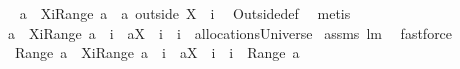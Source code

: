 \begin{isabellebody}
%
\isadelimproof
%
\endisadelimproof
%
\isatagproof
{}\isamarkupfalse%
\ {\isacharminus}\isanewline
{}\isamarkupfalse%
\ {\isachardoublequoteopen}a\ {\isacharminus}\ {\isacharparenleft}{\isacharparenleft}X{\isasymunion}{\isacharbraceleft}i{\isacharbraceright}{\isacharparenright}{\isasymtimes}{\isacharparenleft}Range\ a{\isacharparenright}{\isacharparenright}\ {\isacharequal}\ a\ outside\ {\isacharparenleft}X\ {\isasymunion}\ {\isacharbraceleft}i{\isacharbraceright}{\isacharparenright}{\isachardoublequoteclose}\ \isamarkupfalse%
\ Outside{\isacharunderscore}def\ \isamarkupfalse%
\ metis\isanewline
{}\isamarkupfalse%
\ \isamarkupfalse%
\ {\isachardoublequoteopen}{\isacharparenleft}a\ {\isacharminus}\ {\isacharparenleft}{\isacharparenleft}X{\isasymunion}{\isacharbraceleft}i{\isacharbraceright}{\isacharparenright}{\isasymtimes}{\isacharparenleft}Range\ a{\isacharparenright}{\isacharparenright}{\isacharparenright}\ {\isasymunion}\ {\isacharparenleft}{\isacharbraceleft}{\isacharparenleft}i{\isacharcomma}\ {\isasymUnion}\ {\isacharparenleft}a{\isacharbackquote}{\isacharbackquote}{\isacharparenleft}X\ {\isasymunion}\ {\isacharbraceleft}i{\isacharbraceright}{\isacharparenright}{\isacharparenright}{\isacharparenright}{\isacharbraceright}\ {\isacharminus}\ {\isacharbraceleft}{\isacharparenleft}i{\isacharcomma}{\isacharbraceleft}{\isacharbraceright}{\isacharparenright}{\isacharbraceright}{\isacharparenright}\ {\isasymin}\ allocationsUniverse{\isachardoublequoteclose}\isanewline
{}\isamarkupfalse%
\ assms\ lm{}{}\ \isamarkupfalse%
\ fastforce\isanewline
{}\isamarkupfalse%
\ \isamarkupfalse%
\ {\isachardoublequoteopen}{\isasymUnion}\ {\isacharparenleft}Range\ {\isacharparenleft}{\isacharparenleft}a\ {\isacharminus}\ {\isacharparenleft}{\isacharparenleft}X{\isasymunion}{\isacharbraceleft}i{\isacharbraceright}{\isacharparenright}{\isasymtimes}{\isacharparenleft}Range\ a{\isacharparenright}{\isacharparenright}{\isacharparenright}\ {\isasymunion}\ {\isacharparenleft}{\isacharbraceleft}{\isacharparenleft}i{\isacharcomma}\ {\isasymUnion}\ {\isacharparenleft}a{\isacharbackquote}{\isacharbackquote}{\isacharparenleft}X\ {\isasymunion}\ {\isacharbraceleft}i{\isacharbraceright}{\isacharparenright}{\isacharparenright}{\isacharparenright}{\isacharbraceright}\ {\isacharminus}\ {\isacharbraceleft}{\isacharparenleft}i{\isacharcomma}{\isacharbraceleft}{\isacharbraceright}{\isacharparenright}{\isacharbraceright}{\isacharparenright}{\isacharparenright}{\isacharparenright}\ {\isacharequal}\ {\isasymUnion}{\isacharparenleft}Range\ a{\isacharparenright}{\isachardoublequoteclose}\isanewline

\end{isabellebody}
